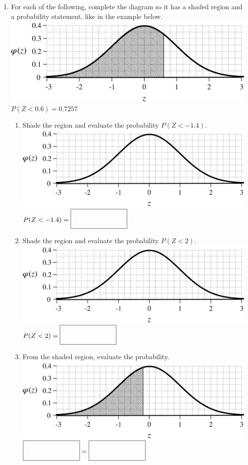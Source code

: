 \documentclass[12pt,letterpaper]{article}
\begin{document}
\newcommand{\emptybox}{\fbox{\text{ }\hspace{60pt}\text{ \phantom{$\cfrac{h}{h}$} }}}
\begin{enumerate}
\item For each of the following, complete the diagram so it has a shaded region and a probability statement, like in the example below.
\\\includegraphics[scale=0.7]{0p6.png} $P(Z<0.6) = 0.7257$
\begin{enumerate}
\vfill
\item Shade the region and evaluate the probability $P(Z<-1.4)$.
\\\includegraphics[scale=0.7]{blank.png} $P(Z<-1.4)=\emptybox$
\vfill
\item Shade the region and evaluate the probability $P(Z<2)$.
\\\includegraphics[scale=0.7]{blank.png} $P(Z<2)=\emptybox$
\vfill
\item From the shaded region, evaluate the probability.
\\\includegraphics[scale=0.7]{n0p2.png}  $\emptybox=\emptybox$
\vfill
\end{enumerate}
\end{enumerate}
\end{document}
